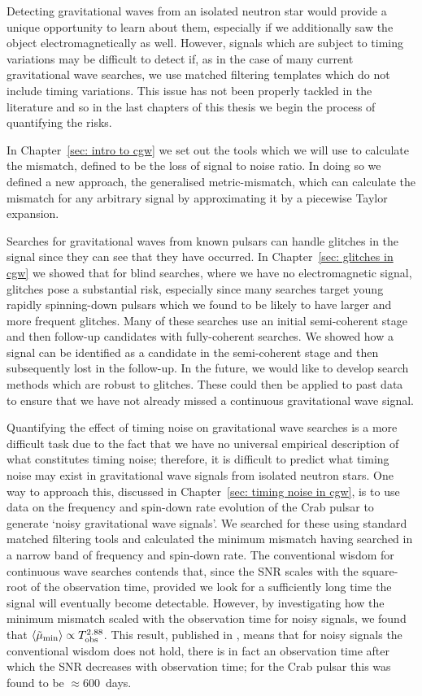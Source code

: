 \documentclass[twoside, 11pt]{thesis}
\begin{document}
Detecting gravitational waves from an isolated neutron star would provide a
unique opportunity to learn about them, especially if we additionally saw the
object electromagnetically as well. However, signals which are subject to
timing variations may be difficult to detect if, as in the case of many current
gravitational wave searches, we use matched filtering templates which do not
include timing variations. This issue has not been properly tackled in the
literature and so in the last chapters of this thesis we begin the process of
quantifying the risks.

In Chapter~\ref{sec: intro to cgw} we set out the tools which we will use to
calculate the mismatch, defined to be the loss of signal to noise ratio. In
doing so we defined a new approach, the generalised metric-mismatch, which can
calculate the mismatch for any arbitrary signal by approximating it by a
piecewise Taylor expansion.

Searches for gravitational waves from known pulsars can handle glitches in the
signal since they can see that they have occurred. In Chapter~\ref{sec:
glitches in cgw} we showed that for blind searches, where we have no
electromagnetic signal, glitches pose a substantial risk, especially since many
searches target young rapidly spinning-down pulsars which we found to be
likely to have larger and more frequent glitches. Many of these searches use
an initial semi-coherent stage and then follow-up candidates with
fully-coherent searches.  We showed how a signal can be identified as a
candidate in the semi-coherent stage and then subsequently lost in the
follow-up. In the future, we would like to develop search methods which are
robust to glitches. These could then be applied to past data to ensure that we
have not already missed a continuous gravitational wave signal.

Quantifying the effect of timing noise on gravitational wave searches is a more
difficult task due to the fact that we have no universal empirical description
of what constitutes timing noise; therefore, it is difficult to predict what
timing noise may exist in gravitational wave signals from isolated neutron
stars.  One way to approach this, discussed in Chapter~\ref{sec: timing noise
in cgw}, is to use data on the frequency and spin-down rate evolution of the
Crab pulsar to generate `noisy gravitational wave signals'.  We searched for
these using standard matched filtering tools and calculated the minimum
mismatch having searched in a narrow band of frequency and spin-down rate. The
conventional wisdom for continuous wave searches contends that, since the SNR
scales with the square-root of the observation time, provided we look for a
sufficiently long time the signal will eventually become detectable.  However,
by investigating how the minimum mismatch scaled with the observation time for
noisy signals, we found that $\langle \tilde{\mu}_{\textrm{min}} \rangle \propto
T_{\mathrm{obs}}^{2.88}$.  This result, published in \citet{Ashton2015}, means that for
noisy signals the conventional wisdom does not hold, there is in fact an
observation time after which the SNR decreases with observation time; for the
Crab pulsar this was found to be $ \approx 600$~days.
\end{document}
